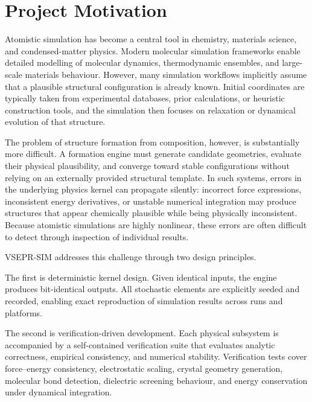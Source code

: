 \documentclass[11pt,twoside]{article}
\begin{document}
\section{Project Motivation}
\label{sec:motivation}

Atomistic simulation has become a central tool in chemistry, materials science, and condensed-matter physics. Modern molecular simulation frameworks enable detailed modelling of molecular dynamics, thermodynamic ensembles, and large-scale materials behaviour. However, many simulation workflows implicitly assume that a plausible structural configuration is already known. Initial coordinates are typically taken from experimental databases, prior calculations, or heuristic construction tools, and the simulation then focuses on relaxation or dynamical evolution of that structure.

The problem of structure formation from composition, however, is substantially more difficult. A formation engine must generate candidate geometries, evaluate their physical plausibility, and converge toward stable configurations without relying on an externally provided structural template. In such systems, errors in the underlying physics kernel can propagate silently: incorrect force expressions, inconsistent energy derivatives, or unstable numerical integration may produce structures that appear chemically plausible while being physically inconsistent. Because atomistic simulations are highly nonlinear, these errors are often difficult to detect through inspection of individual results.

VSEPR-SIM addresses this challenge through two design principles.

The first is deterministic kernel design. Given identical inputs, the engine produces bit-identical outputs. All stochastic elements are explicitly seeded and recorded, enabling exact reproduction of simulation results across runs and platforms.

The second is verification-driven development. Each physical subsystem is accompanied by a self-contained verification suite that evaluates analytic correctness, empirical consistency, and numerical stability. Verification tests cover force--energy consistency, electrostatic scaling, crystal geometry generation, molecular bond detection, dielectric screening behaviour, and energy conservation under dynamical integration.
\end{document}
